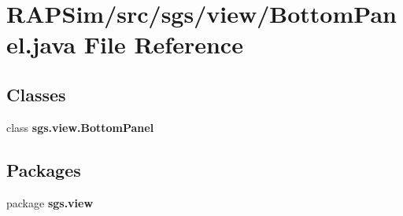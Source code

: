 \section{R\-A\-P\-Sim/src/sgs/view/\-Bottom\-Panel.java File Reference}
\label{_bottom_panel_8java}
\subsection*{Classes}
\begin{DoxyCompactItemize}
\item 
class {\bf sgs.\-view.\-Bottom\-Panel}
\end{DoxyCompactItemize}
\subsection*{Packages}
\begin{DoxyCompactItemize}
\item 
package {\bf sgs.\-view}
\end{DoxyCompactItemize}
